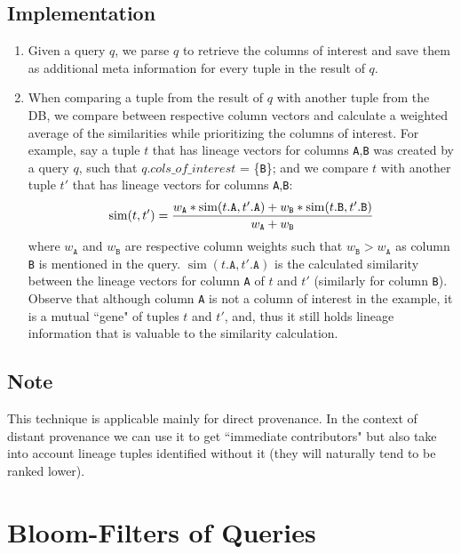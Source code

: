 \subsection{Implementation} 
\begin{enumerate}
    \item Given a query $q$, we parse $q$ to retrieve the columns of interest and save them as additional meta information for every tuple in the result of $q$.
    \item When comparing a tuple from the result of $q$ with another tuple from the DB, we compare between respective column vectors and calculate a weighted average of the similarities while prioritizing the columns of interest. For example, say a tuple $t$ that has lineage vectors for columns \texttt{A},\texttt{B} was created by a query $q$, such that $q.cols\_of\_interest$ = \{\texttt{B}\}; and we compare $t$ with another tuple $t'$ that has lineage vectors for columns \texttt{A},\texttt{B}:\\
    \begin{equation*}
        \operatorname{sim}(t, t') = \frac{w_\texttt{A}*\operatorname{sim}(t.\texttt{A}, t'.\texttt{A}) +
        w_\texttt{B}*\operatorname{sim}(t.\texttt{B}, t'.\texttt{B})}{w_\texttt{A} + w_\texttt{B}}\\
    \end{equation*}
    where $w_\texttt{A}$ and $w_\texttt{B}$ are respective column weights such that $w_\texttt{B} > w_\texttt{A}$ as column \texttt{B} is mentioned in the query. $\operatorname{sim}(t.\texttt{A}, t'.\texttt{A})$ is the calculated similarity between the lineage vectors for column \texttt{A} of $t$ and $t'$ (similarly for column \texttt{B}). Observe that although column \texttt{A} is not a column of interest in the example, it is a mutual ``gene" of tuples $t$ and $t'$, and, thus it still holds lineage information that is valuable to the similarity calculation.
\end{enumerate}

\subsection{Note} This technique is applicable mainly for direct provenance. In the context of distant provenance we can use it to get ``immediate contributors" but also take into account lineage tuples identified without it (they will naturally tend to be ranked lower).
 


\section{Bloom-Filters of Queries}\label{sec:bloom-filters}
